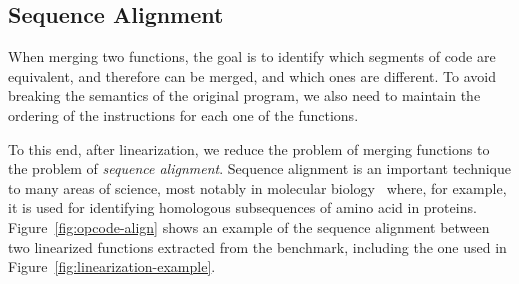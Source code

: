 
\subsection{Sequence Alignment}

When merging two functions, the goal is to identify which segments of code
are equivalent, and therefore can be merged, and which ones are different.
To avoid breaking the semantics of the original program, we also need to
maintain the ordering of the instructions for each one of the functions.

To this end, after linearization, we reduce the problem of merging functions
to the problem of \textit{sequence alignment}. %
Sequence alignment is an important technique to many areas of science,
most notably in molecular biology~\cite{needleman70,smith81,carrillo88,wang94}
where, for example, it is used for identifying homologous subsequences of amino
acid in proteins.
Figure~\ref{fig:opcode-align} shows an example of the sequence alignment
between two linearized functions extracted from the  benchmark,
including the one used in Figure~\ref{fig:linearization-example}.

